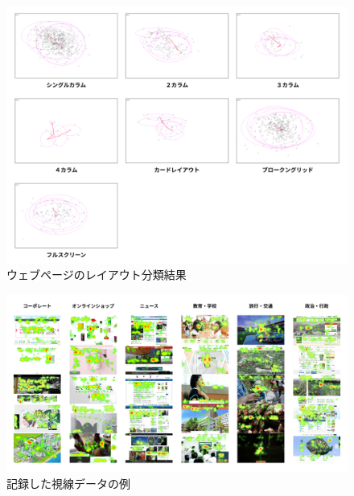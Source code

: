 \begin{figure}[H]
  \centering
  \includegraphics[width=12cm]{figures/05_layout_result.jpg}
  \caption{ウェブページのレイアウト分類結果}
  \label{fig_layout_result}
\end{figure}

\begin{figure}[H]
  \centering
  \includegraphics[width=12.5cm]{figures/05_dataset_saliency.jpg}
  \caption{記録した視線データの例}
  \label{fig_dataset-saliency}
\end{figure}

